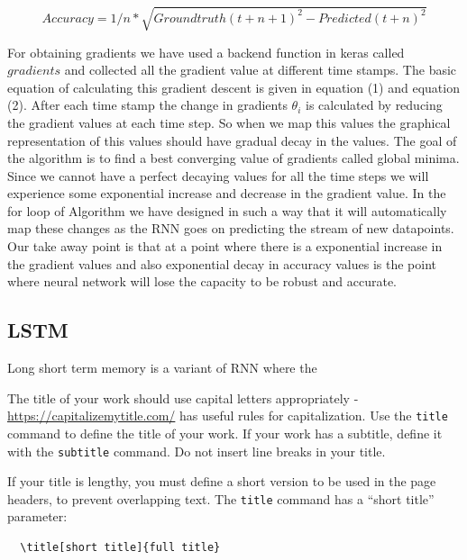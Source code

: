 \documentclass[sigconf,authordraft]{acmart}
\begin{document}
\begin{equation}
  Accuracy = 1/n * \sqrt{{Ground truth (t+n+1)}^2 - {Predicted (t+n)}^2}
\end{equation}

For obtaining gradients we have used a backend function in keras called $gradients$ and collected all the gradient value at different time stamps. The basic equation of calculating this gradient descent is given in equation (1) and equation (2). After each time stamp the change in gradients $\theta_i$ is calculated by reducing the gradient values at each time step. So when we map this values the graphical representation of this values should have gradual decay in the values. The goal of the algorithm is to find a best converging value of gradients called global minima. Since we cannot have a perfect decaying values for all the time steps we will experience some exponential increase and decrease in the gradient value. In the for loop of Algorithm we have designed in such a way that it will automatically map these changes as the RNN goes on predicting the stream of new datapoints. Our take away point is that at a point where there is a exponential increase in the gradient values and also exponential decay in accuracy values is the point where neural network will lose the capacity to be robust and accurate. 



\subsection{LSTM}
Long short term memory is a variant of RNN where the 

The title of your work should use capital letters appropriately -
\url{https://capitalizemytitle.com/} has useful rules for
capitalization. Use the {\verb|title|} command to define the title of
your work. If your work has a subtitle, define it with the
{\verb|subtitle|} command.  Do not insert line breaks in your title.

If your title is lengthy, you must define a short version to be used
in the page headers, to prevent overlapping text. The \verb|title|
command has a ``short title'' parameter:
\begin{verbatim}
  \title[short title]{full title}
\end{verbatim}
\end{document}
